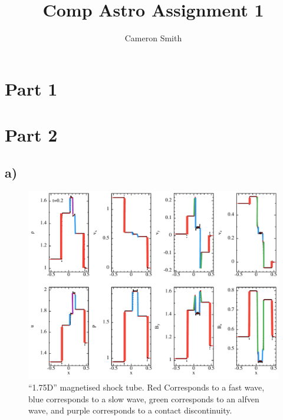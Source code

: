 \documentclass{article}
\title{Comp Astro Assignment 1}
\author{Cameron Smith }
\begin{document}
\maketitle

\section*{Part 1}



\section*{Part 2}
\subsection*{a)}

\begin{figure}[h]
    \centering
    \includegraphics[width=\linewidth]{2a_labeled.pdf}
    \caption{``1.75D'' magnetised shock tube. Red Corresponds to a fast wave,
    blue corresponds to a slow wave, green corresponds to an alfven wave, and
    purple corresponds to a contact discontinuity.
    }
    \label{2a}
\end{figure}
\end{document}
